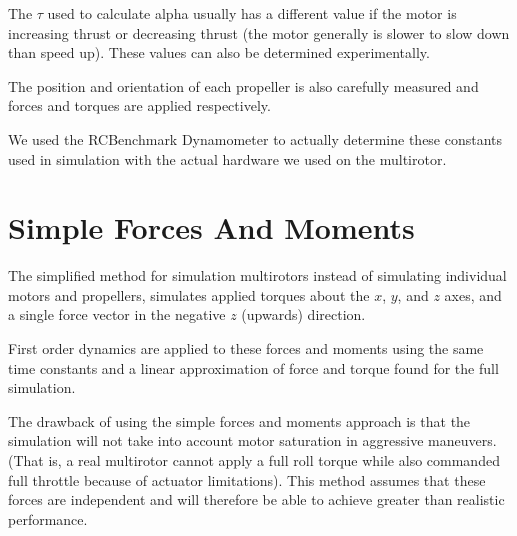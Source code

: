 \documentclass{article}
\begin{document}
The $\tau$ used to calculate alpha usually has a different value if the motor is increasing thrust or decreasing thrust (the motor generally is slower to slow down than speed up). These values can also be determined experimentally.

The position and orientation of each propeller is also carefully measured and forces and torques are applied respectively.

We used the RCBenchmark Dynamometer to actually determine these constants used in simulation with the actual hardware we used on the multirotor.

\section{Simple Forces And Moments}
The simplified method for simulation multirotors instead of simulating individual motors and propellers, simulates applied torques about the $x$, $y$, and $z$ axes, and a single force vector in the negative $z$ (upwards) direction.

First order dynamics are applied to these forces and moments using the same time constants and a linear approximation of force and torque found for the full simulation.

The drawback of using the simple forces and moments approach is that the simulation will not take into account motor saturation in aggressive maneuvers.  (That is, a real multirotor cannot apply a full roll torque while also commanded full throttle because of actuator limitations).  This method assumes that these forces are independent and will therefore be able to achieve greater than realistic performance.
\end{document}
